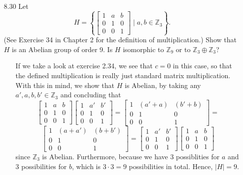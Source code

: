 \documentclass[12pt]{article}
\begin{document}
\begin{enumerate}
\item[8.30] Let
\[
H = 
\left\{
\left[
\begin{array}{ccc}
1 & a & b \\
0 & 1 & 0 \\
0 & 0 & 1
\end{array}
\right]
\mid a, b \in \mathbb{Z}_3 
\right\}.
\]
(See Exercise 34 in Chapter 2 for the definition of multiplication.) Show that $H$ is an 
Abelian group of order 9. Is $H$ isomorphic to $\mathbb{Z}_9$ or to $\mathbb{Z}_3 \oplus 
\mathbb{Z}_3$?
\begin{enumerate}
\item[] If we take a look at exercise 2.34, we see that $c = 0$ in this case, so that the defined
multiplication is really just standard matrix multiplication. With this in mind, we show that
$H$ is Abelian, by taking any $a', a, b, b' \in \mathbb{Z}_3$ and concluding that
\[
\left[
\begin{array}{ccc}
1 & a & b \\
0 & 1 & 0 \\
0 & 0 & 1
\end{array}
\right]
\left[
\begin{array}{ccc}
1 & a' & b' \\
0 & 1 & 0 \\
0 & 0 & 1
\end{array}
\right] =
\left[
\begin{array}{ccc}
1 & (a' + a) & (b' + b) \\
0 & 1 & 0 \\
0 & 0 & 1
\end{array}
\right] =
\]
\[
\left[
\begin{array}{ccc}
1 & (a + a') & (b + b') \\
0 & 1 & 0 \\
0 & 0 & 1
\end{array}
\right] =
\left[
\begin{array}{ccc}
1 & a' & b' \\
0 & 1 & 0 \\
0 & 0 & 1
\end{array}
\right]
\left[
\begin{array}{ccc}
1 & a & b \\
0 & 1 & 0 \\
0 & 0 & 1
\end{array}
\right]
\] 
since $\mathbb{Z}_3$ is Abelian. Furthermore, because we have 3 possiblities for $a$
and 3 possibilities for $b$, which is $3 \cdot 3 = 9$ possibilities in total. Hence,
$|H| = 9$. \\

\end{enumerate}
\end{enumerate}
\end{document}
